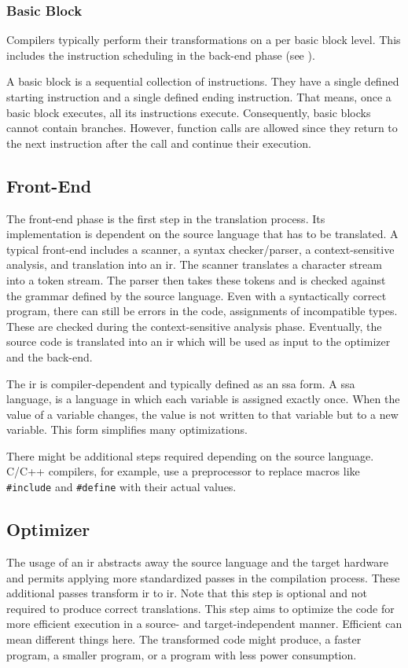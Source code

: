 \subsubsection{Basic Block}
Compilers typically perform their transformations on a per basic block level.
This includes the instruction scheduling in the back-end phase (see ).

A basic block is a sequential collection of instructions.
They have a single defined starting instruction and a single defined ending instruction.
That means, once a basic block executes, all its instructions execute.
Consequently, basic blocks cannot contain branches.
However, function calls are allowed since they return to the next instruction after the call and continue their execution.

\subsection{Front-End}
\label{sec:bg:compilers:frontend}
The front-end phase is the first step in the translation process.
Its implementation is dependent on the source language that has to be translated.
A typical front-end includes a scanner, a syntax checker/parser, a context-sensitive analysis, and translation into an \ac{ir}.
The scanner translates a character stream into a token stream.
The parser then takes these tokens and is checked against the grammar defined by the source language.
Even with a syntactically correct program, there can still be errors in the code, \eg assignments of incompatible types.
These are checked during the context-sensitive analysis phase.
Eventually, the source code is translated into an \ac{ir} which will be used as input to the optimizer and the back-end.

The \ac{ir} is compiler-dependent and typically defined as an \ac{ssa} form.
A \ac{ssa} language, is a language in which each variable is assigned exactly once.
When the value of a variable changes, the value is not written to that variable but to a new variable.
This form simplifies many optimizations.

There might be additional steps required depending on the source language.
C/C++ compilers, for example, use a preprocessor to replace macros like \lstinline{#include} and \lstinline{#define} with their actual values.

\subsection{Optimizer}
\label{sec:bg:compilers:optimizer}
The usage of an \ac{ir} abstracts away the source language and the target hardware and permits applying more standardized passes in the compilation process.
These additional passes transform \ac{ir} to \ac{ir}.
Note that this step is optional and not required to produce correct translations.
This step aims to optimize the code for more efficient execution in a source- and target-independent manner.
Efficient can mean different things here.
The transformed code might produce, \eg a faster program, a smaller program, or a program with less power consumption.

